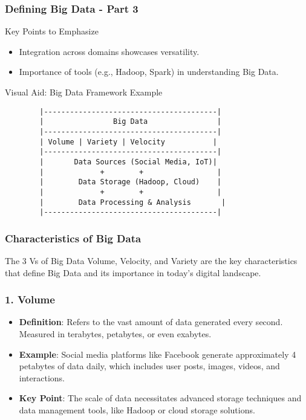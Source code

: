 \documentclass[aspectratio=169]{beamer}
\begin{document}
\begin{frame}[fragile]
    \frametitle{Defining Big Data - Part 3}
    \begin{block}{Key Points to Emphasize}
        \begin{itemize}
            \item Integration across domains showcases versatility.
            \item Importance of tools (e.g., Hadoop, Spark) in understanding Big Data.
        \end{itemize}
    \end{block}
    
    \begin{block}{Visual Aid: Big Data Framework Example}
        \begin{lstlisting}
        |----------------------------------------|
        |                Big Data                |
        |----------------------------------------|
        | Volume | Variety | Velocity           |
        |----------------------------------------|
        |       Data Sources (Social Media, IoT)|
        |             +        +                 |
        |        Data Storage (Hadoop, Cloud)    |
        |             +        +                 |
        |        Data Processing & Analysis       |
        |----------------------------------------|
        \end{lstlisting}
    \end{block}
\end{frame}

\begin{frame}[fragile]
    \frametitle{Characteristics of Big Data}
    \begin{block}{The 3 Vs of Big Data}
        Volume, Velocity, and Variety are the key characteristics that define Big Data and its importance in today's digital landscape.
    \end{block}
\end{frame}

\begin{frame}[fragile]
    \frametitle{1. Volume}
    \begin{itemize}
        \item \textbf{Definition}: Refers to the vast amount of data generated every second. Measured in terabytes, petabytes, or even exabytes.
        \item \textbf{Example}: Social media platforms like Facebook generate approximately 4 petabytes of data daily, which includes user posts, images, videos, and interactions.
        \item \textbf{Key Point}: The scale of data necessitates advanced storage techniques and data management tools, like Hadoop or cloud storage solutions.
    \end{itemize}
\end{frame}
\end{document}
